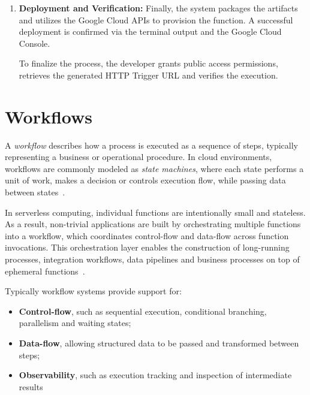 \begin{enumerate}
	\begin{lstlisting}[language=Java, caption={Cloud-agnostic hook function implementation.}, label={lst:hook_function}]
	import quickfaas.triggers.http.HttpRequestQf;
	import quickfaas.triggers.http.HttpResponseQf;
	
	public class MyFunctionClass {
		
		public void myFunction(HttpRequestQf req, HttpResponseQf res) { 
			res.send(200, "Hello world!"); 
		}
	}
	\end{lstlisting}
	
	\item \textbf{Deployment and Verification:} Finally, the system packages the artifacts and utilizes the Google Cloud APIs to provision the function. A successful deployment is confirmed via the terminal output and the Google Cloud Console.
	
	
	To finalize the process, the developer grants public access permissions, retrieves the generated HTTP Trigger URL and verifies the execution.

\end{enumerate}
\section{Workflows}
\label{sec:workflows}

A \textit{workflow} describes how a process is executed as a sequence of steps, typically representing a business or operational procedure. In cloud environments, workflows are commonly modeled as \textit{state machines}, where each state performs a unit of work, makes a decision or controls execution flow, while passing data between states~\cite{aws_stepfunctions_concepts}.

In serverless computing, individual functions are intentionally small and stateless. As a result, non-trivial applications are built by orchestrating multiple functions into a workflow, which coordinates control-flow and data-flow across function invocations. This orchestration layer enables the construction of long-running processes, integration workflows, data pipelines and business processes on top of ephemeral functions~\cite{sebsflow_arxiv}.

Typically workflow systems provide support for:
\begin{itemize}
	\item \textbf{Control-flow}, such as sequential execution, conditional branching, parallelism and waiting states;
	\item \textbf{Data-flow}, allowing structured data to be passed and transformed between steps;
	\item \textbf{Observability}, such as execution tracking and inspection of intermediate results 
\end{itemize}

